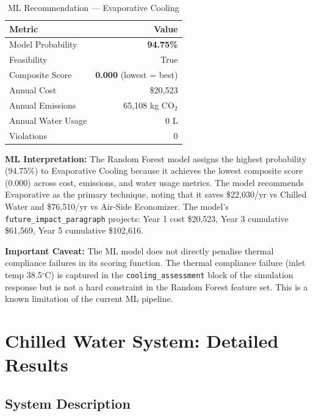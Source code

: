 \documentclass[12pt,a4paper]{report}
\newcommand{\degC}{$^{\circ}$C}
\begin{document}
\begin{table}[H]
\centering
\caption{ML Recommendation --- Evaporative Cooling}
\label{tab:evap_ml}
\renewcommand{\arraystretch}{1.3}
\begin{tabular}{lr}
\toprule
\textbf{Metric} & \textbf{Value} \\
\midrule
Model Probability & \textbf{94.75\%} \\
Feasibility & True \\
Composite Score & \textbf{0.000} (lowest = best) \\
Annual Cost & \$20{,}523 \\
Annual Emissions & 65{,}108 kg CO$_2$ \\
Annual Water Usage & 0 L \\
Violations & 0 \\
\bottomrule
\end{tabular}
\end{table}

\noindent\textbf{ML Interpretation:} The Random Forest model assigns the highest probability (94.75\%)
to Evaporative Cooling because it achieves the lowest composite score (0.000) across cost, emissions,
and water usage metrics. The model recommends Evaporative as the primary technique, noting that it
saves \$22{,}030/yr vs Chilled Water and \$76{,}510/yr vs Air-Side Economizer. The model's
\texttt{future\_impact\_paragraph} projects: Year 1 cost \$20{,}523, Year 3 cumulative \$61{,}569,
Year 5 cumulative \$102{,}616.

\noindent\textbf{Important Caveat:} The ML model does not directly penalise thermal compliance failures
in its scoring function. The thermal compliance failure (inlet temp 38.5\degC) is captured in the
\texttt{cooling\_assessment} block of the simulation response but is not a hard constraint in the
Random Forest feature set. This is a known limitation of the current ML pipeline.

\newpage

\chapter{Chilled Water System: Detailed Results}
\label{ch:chw}

\section{System Description}
\end{document}
